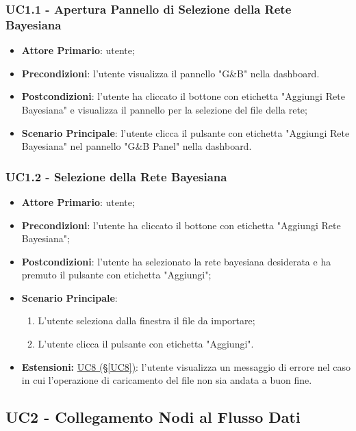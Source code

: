 \subsubsection{UC1.1 - Apertura Pannello di Selezione della Rete Bayesiana}\label{UC1.1}
\begin{itemize}
	\item \textbf{Attore Primario}: utente; 
	\item \textbf{Precondizioni}: l'utente visualizza il pannello "G\&B" nella dashboard.
	\item \textbf{Postcondizioni}: l'utente ha cliccato il bottone con etichetta "Aggiungi Rete Bayesiana" e visualizza il pannello per la selezione del file della rete;
	\item \textbf{Scenario Principale}: l'utente clicca il pulsante con etichetta "Aggiungi Rete Bayesiana" nel pannello "G\&B Panel" nella dashboard.
\end{itemize}


\subsubsection{UC1.2 - Selezione della Rete Bayesiana}\label{UC1.2}
\begin{itemize}
	\item \textbf{Attore Primario}: utente;
	\item \textbf{Precondizioni}: l'utente ha cliccato il bottone con etichetta "Aggiungi Rete Bayesiana";
	\item \textbf{Postcondizioni}: l'utente ha selezionato la rete bayesiana desiderata e ha premuto il pulsante con etichetta "Aggiungi";
	\item \textbf{Scenario Principale}:
	\begin{enumerate}
		\item L'utente seleziona dalla finestra il file da importare;
		\item L'utente clicca il pulsante con etichetta "Aggiungi".
	\end{enumerate}
	\item \textbf{Estensioni:} \hyperref[UC8]{UC8 (§\ref*{UC8})}: l'utente visualizza un messaggio di errore nel caso in cui l'operazione di caricamento del file non sia andata a buon fine.
\end{itemize}

\pagebreak

\subsection{UC2 - Collegamento Nodi al Flusso Dati}\label{UC2}

